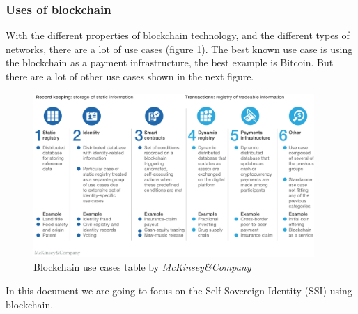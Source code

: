 \documentclass[a4paper, 12pt]{article} %
\begin{document}
            \subsubsection{Uses of blockchain}
                With the different properties of blockchain technology, and the different types of networks, there are a lot of use cases (figure \ref{fig:blockchain_uses}). The best known use case is using the blockchain as a payment infrastructure, the best example is Bitcoin. But there are a lot of other use cases shown in the next figure.\\
                \begin{figure}[h]
                    \centering
                    \includegraphics[width=0.95\textwidth]{Blockchain-uses.png}
                    \caption{Blockchain use cases table by \textit{McKinsey\&Company}}
                    \label{fig:blockchain_uses}
                \end{figure}
                
                In this document we are going to focus on the Self Sovereign Identity (SSI) using blockchain.
\end{document}
